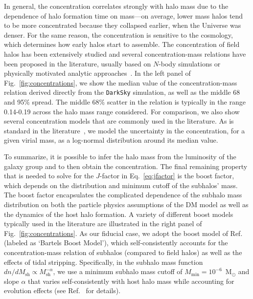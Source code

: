 In general, the concentration correlates strongly with halo mass due to the dependence of halo formation time on mass---on average, lower mass halos tend to be more concentrated because they collapsed earlier, when the Universe was denser.  For the same reason, the concentration is sensitive to the cosmology, which determines how early halos start to assemble. 
The concentration of field halos has been extensively studied and several concentration-mass relations have been proposed in the literature, usually based on $N$-body simulations or physically motivated analytic approaches~\cite{Duffy:2008pz,Prada:2011jf,Sanchez-Conde:2013yxa,Diemer:2014gba,Correa:2015dva,Moline:2016pbm,Klypin:2014kpa,Dutton:2014xda}. In the left panel of Fig.~\ref{fig:concentrations}, we show the median value of the concentration-mass relation derived directly from the \texttt{DarkSky} simulation, as well as the middle 68 and 95\% spread. The middle 68\% scatter in the relation is typically in the range 0.14-0.19 across the halo mass range considered. For comparison, we also show several concentration models that are commonly used in the literature.  As is standard in the literature~\cite{Hutten:2016jko,Sanchez-Conde:2013yxa}, we model the uncertainty in the concentration, for a given virial mass, as a log-normal distribution around its median value.  

To summarize, it is possible to infer the halo mass from the luminosity of the galaxy group and to then obtain the concentration.  The final remaining property that is needed to solve for the $J$-factor in Eq.~\ref{eq:jfactor} is the boost factor, which depends on the distribution and minimum cutoff of the subhalos' mass.  The boost factor encapsulates the complicated dependence of the subhalo mass distribution on both the particle physics assumptions of the DM model as well as the dynamics of the host halo formation.  A variety of different boost models typically used in the literature are illustrated in the right panel of Fig.~\ref{fig:concentrations}.  As our fiducial case, we adopt the boost model of Ref.~\cite{Bartels:2015uba} (labeled as `Bartels Boost Model'), which self-consistently accounts for  the concentration-mass relation of subhalos (compared to field halos) as well as the effects of tidal stripping. Specifically, in the subhalo mass function $dn/dM_\text{sh}\propto M_\text{sh}^{-\alpha}$, we use a minimum subhalo mass cutoff of $M_\text{min}=10^{-6}$~M$_{\odot}$ and slope $\alpha$ that varies self-consistently with host halo mass while accounting for evolution effects (see Ref.~\cite{Bartels:2015uba} for details).

